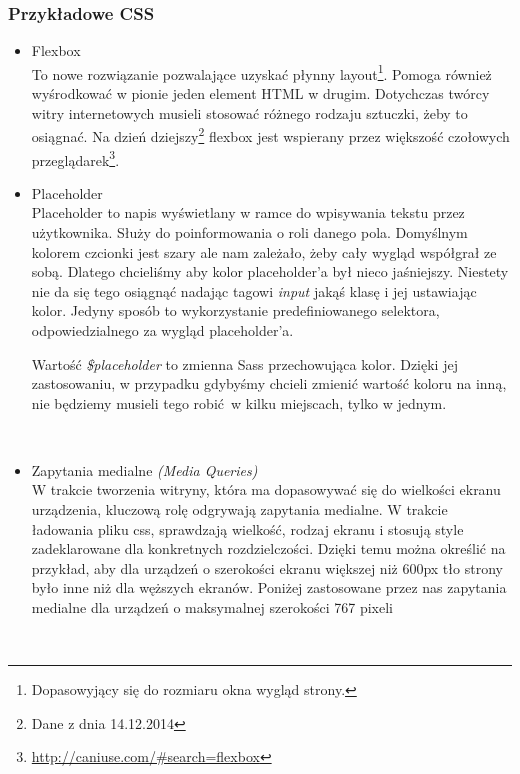     \subsubsection{Przykładowe CSS}
      \begin{itemize}
        \item Flexbox\\
          To nowe rozwiązanie pozwalające uzyskać płynny layout\footnote{Dopasowyjący się do rozmiaru okna wygląd strony.}. Pomoga również wyśrodkować w pionie jeden element HTML w drugim. Dotychczas twórcy witry internetowych musieli stosować różnego rodzaju sztuczki, żeby to osiągnać. Na dzień dziejszy\footnote{Dane z dnia 14.12.2014} flexbox jest wspierany przez większość czołowych przeglądarek\footnote{\url{http://caniuse.com/\#search=flexbox}}.
          
        \item Placeholder\\
          Placeholder to napis wyświetlany w ramce do wpisywania tekstu przez użytkownika. Służy do poinformowania o roli danego pola. Domyślnym kolorem czcionki jest szary ale nam zależało, żeby cały wygląd współgrał ze sobą. Dlatego chcieliśmy aby kolor placeholder'a był nieco jaśniejszy. Niestety nie da się tego osiągnąć nadając tagowi \emph{input} jakąś klasę i jej ustawiając kolor. Jedyny sposób to wykorzystanie predefiniowanego selektora, odpowiedzialnego za wygląd placeholder'a.

          Wartość \emph{\$placeholder} to zmienna Sass przechowująca kolor. Dzięki jej zastosowaniu, w przypadku gdybyśmy chcieli zmienić wartość koloru na inną, nie będziemy musieli tego robić w kilku miejscach, tylko w jednym.

          \begin{code}
            
          \end{code}\\

        \item Zapytania medialne \emph{(Media Queries)}\\
          W trakcie tworzenia witryny, która ma dopasowywać się do wielkości ekranu urządzenia, kluczową rolę odgrywają zapytania medialne. W trakcie ładowania pliku css, sprawdzają wielkość, rodzaj ekranu i stosują style zadeklarowane dla konkretnych rozdzielczości. Dzięki temu można określić na przykład, aby dla urządzeń o szerokości ekranu większej niż 600px tło strony było inne niż dla węższych ekranów.
          Poniżej zastosowane przez nas zapytania medialne dla urządzeń o maksymalnej szerokości 767 pixeli
          \begin{code}
            
          \end{code}\\

      \end{itemize}
